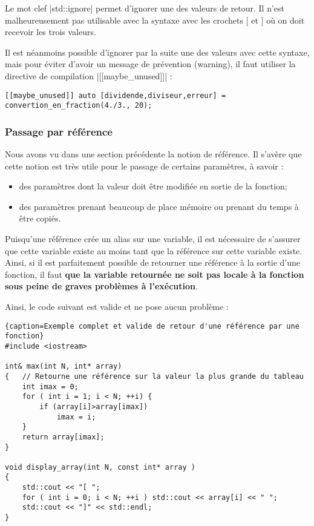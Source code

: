 \begin{itemize}
Le mot clef |std::ignore| permet d'ignorer une des valeurs de retour. Il n'est malheureusement pas
utilisable avec la syntaxe avec les crochets $[$ et $]$ où on doit recevoir les trois valeurs.

Il est néanmoins possible d'ignorer par la suite une des valeurs avec cette syntaxe, mais pour éviter
d'avoir un message de prévention (warning), il faut utiliser la directive de compilation
|[[maybe_unused]]| :
\begin{lstlisting}
[[maybe_unused]] auto [dividende,diviseur,erreur] = convertion_en_fraction(4./3., 20);
\end{lstlisting}


\subsubsection{Passage par référence}

Nous avons vu dans une section précédente la notion de référence. Il s'avère que cette notion est
très utile pour le passage de certains paramètres, à savoir :
\begin{itemize}
  \item des paramètres dont la valeur doit être modifiée en sortie de la fonction;
  \item des paramètres prenant beaucoup de place mémoire ou prenant du temps à être copiés.
\end{itemize}



Puisqu'une référence crée un alias sur une variable, il est nécessaire de s'assurer que cette variable existe au moins tant que la référence sur cette variable existe. Ainsi, si il est parfaitement possible de retourner une référence à la sortie d'une fonction, il faut \textbf{que la variable retournée ne soit pas locale à la fonction sous peine de graves problèmes à l'exécution}.

Ainsi, le code suivant est valide et ne pose aucun problème :

\begin{lstlisting}{caption=Exemple complet et valide de retour d'une référence par une fonction}
#include <iostream>

int& max(int N, int* array)
{   // Retourne une référence sur la valeur la plus grande du tableau
    int imax = 0;
    for ( int i = 1; i < N; ++i) {
        if (array[i]>array[imax])
            imax = i;
    }
    return array[imax];
}

void display_array(int N, const int* array )
{
    std::cout << "[ ";
    for ( int i = 0; i < N; ++i ) std::cout << array[i] << " ";
    std::cout << "]" << std::endl;
}


\end{lstlisting}
\end{itemize}
